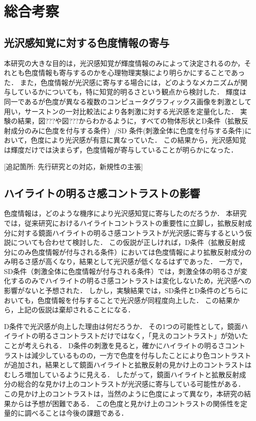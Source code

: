 \chapter{総合考察}
    \section{光沢感知覚に対する色度情報の寄与}
        本研究の大きな目的は，光沢感知覚が輝度情報のみによって決定されるのか，それとも色度情報も寄与するのかを心理物理実験により明らかにすることであった．
        また，色度情報が光沢感に寄与する場合には，どのようなメカニズムが関与しているかについても，特に知覚的明るさという観点から検討した．
        輝度は同一であるが色度が異なる複数のコンピュータグラフィックス画像を刺激として用い，サーストンの一対比較法により各刺激に対する光沢感を定量化した．
        実験の結果，図???や図???からわかるように，すべての物体形状とD条件（拡散反射成分のみに色度を付与する条件）/SD 条件(刺激全体に色度を付与する条件)において，色度により光沢感が有意に異なっていた．
        この結果から，光沢感知覚は輝度だけでは決まらず，色度情報が寄与していることが明らかになった．
        
        [追記箇所: 先行研究との対応，新規性の主張]

    \section{ハイライトの明るさ感コントラストの影響}
        色度情報は，どのような機序により光沢感知覚に寄与したのだろうか．
        本研究では，従来研究におけるハイライトコントラストの重要性に立脚し，拡散反射成分に対する鏡面ハイライトの明るさ感コントラストが光沢感に寄与するという仮説についても合わせて検討した．
        この仮説が正しければ，D条件（拡散反射成分にのみ色度情報が付与される条件）においては色度情報により拡散反射成分のみ明るさ感が高くなり，結果として光沢感が低くなるはずであった．
        一方で，SD条件（刺激全体に色度情報が付与される条件）では，刺激全体の明るさが変化するのみでハイライトの明るさ感コントラストは変化しないため，光沢感への影響がないと予想された．
        しかし，実験結果では，SD条件とD条件のどちらにおいても，色度情報を付与することで光沢感が同程度向上した．
        この結果から，上記の仮説は棄却されることになる．

        D条件で光沢感が向上した理由は何だろうか．
        その1つの可能性として，鏡面ハイライトの明るさコントラストだけではなく，「見えのコントラスト」が効いたことが考えられる．
        D条件の刺激を見ると，確かにハイライトの明るさコントラストは減少しているものの，一方で色度を付与したことにより色コントラストが追加され，結果として鏡面ハイライトと拡散反射の見かけ上のコントラストはむしろ増加しているように見える．
        したがって，鏡面ハイライトと拡散反射成分の総合的な見かけ上のコントラストが光沢感に寄与している可能性がある．
        この見かけ上のコントラストは，当然のように色度によって異なり，本研究の結果からは予想が困難である．
        この色度と見かけ上のコントラストの関係性を定量的に調べることは今後の課題である．

